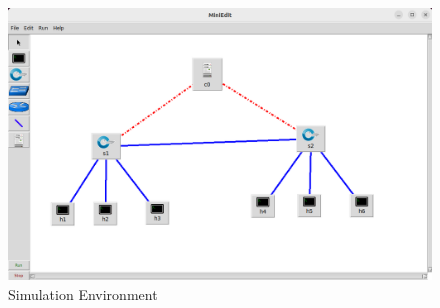 \begin{figure}[tbh]
	\begin{center}
		\includegraphics[width=5in]{images/simenv.png} 
		\caption{Simulation Environment} %
		\label{Simulation Environment} %
	\end{center}
\end{figure}
